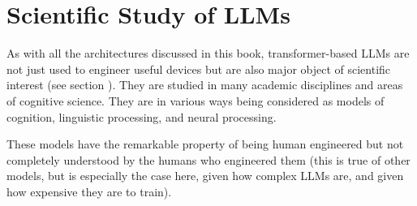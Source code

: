 %
%
% 
%
%
%
%


\section{Scientific Study of LLMs}


As with all the architectures discussed in this book, transformer-based LLMs are not just used to engineer useful devices but are also major object of scientific interest (see section ). They are studied in many academic disciplines and areas of cognitive science. They are in various ways being considered as models of cognition, linguistic processing, and neural processing. 

These models have the remarkable property of being human engineered but not completely understood by the humans who engineered them (this is true of other models, but is especially the case here, given how complex LLMs are, and given how expensive they are to train). 


